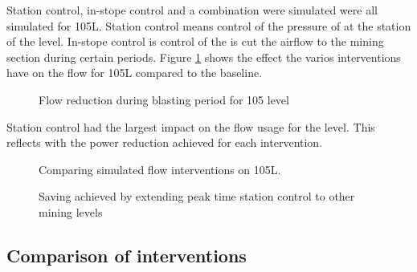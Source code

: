 	Station control, in-stope control and a combination were simulated were all simulated for 105L. Station control means control of the pressure of at the station of the level. In-stope control is control of the is cut the airflow to the mining section during certain periods. Figure \ref{fig: 105 Flow savings} shows the effect the varios interventions have on  the flow for 105L compared to the baseline.
	
	
	\begin{figure}[h!]
		\centering
		
		\caption{Flow reduction during blasting period for 105 level}
		\label{fig: 105 Flow savings}
	\end{figure}
Station control had the largest impact on the flow usage for the level. This reflects with the power reduction achieved for each intervention.
	
	\begin{figure}[h!]
		\centering
		
		\caption{Comparing simulated flow interventions on  105L.}
		\label{fig: Station vs stope}
	\end{figure}

\begin{figure}[h!]
	\centering
	
	\caption{Saving achieved by extending peak time station control to other mining levels}
	\label{fig: General station optimise}
\end{figure}

	\subsection{Comparison of interventions}
	
